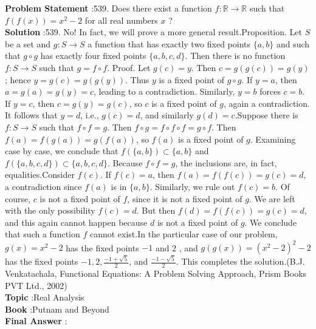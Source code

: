 \documentclass[10pt]{article}
\begin{document}
\textbf{Problem Statement} :539. Does there exist a function $f: \mathbb{R} \rightarrow \mathbb{R}$ such that $f(f(x))=x^{2}-2$ for all real numbers $x$ ?\\
\textbf{Solution} :539. No! In fact, we will prove a more general result.Proposition. Let $S$ be a set and $g: S \rightarrow S$ a function that has exactly two fixed points $\{a, b\}$ and such that $g \circ g$ has exactly four fixed points $\{a, b, c, d\}$. Then there is no function $f: S \rightarrow S$ such that $g=f \circ f$. Proof. Let $g(c)=y$. Then $c=g(g(c))=g(y)$; hence $y=g(c)=g(g(y))$. Thus $y$ is a fixed point of $g \circ g$. If $y=a$, then $a=g(a)=g(y)=c$, leading to a contradiction. Similarly, $y=b$ forces $c=b$. If $y=c$, then $c=g(y)=g(c)$, so $c$ is a fixed point of $g$, again a contradiction. It follows that $y=d$, i.e., $g(c)=d$, and similarly $g(d)=c$.Suppose there is $f: S \rightarrow S$ such that $f \circ f=g$. Then $f \circ g=f \circ f \circ f=g \circ f$. Then $f(a)=f(g(a))=g(f(a))$, so $f(a)$ is a fixed point of $g$. Examining case by case, we conclude that $f(\{a, b\}) \subset\{a, b\}$ and $f(\{a, b, c, d\}) \subset\{a, b, c, d\}$. Because $f \circ f=g$, the inclusions are, in fact, equalities.Consider $f(c)$. If $f(c)=a$, then $f(a)=f(f(c))=g(c)=d$, a contradiction since $f(a)$ is in $\{a, b\}$. Similarly, we rule out $f(c)=b$. Of course, $c$ is not a fixed point of $f$, since it is not a fixed point of $g$. We are left with the only possibility $f(c)=d$. But then $f(d)=f(f(c))=g(c)=d$, and this again cannot happen because $d$ is not a fixed point of $g$. We conclude that such a function $f$ cannot exist.In the particular case of our problem, $g(x)=x^{2}-2$ has the fixed points $-1$ and 2 , and $g(g(x))=\left(x^{2}-2\right)^{2}-2$ has the fixed points $-1,2, \frac{-1+\sqrt{5}}{2}$, and $\frac{-1-\sqrt{5}}{2}$. This completes the solution.(B.J. Venkatachala, Functional Equations: A Problem Solving Approach, Prism Books PVT Ltd., 2002)\\
\textbf{Topic} :Real Analysis\\
\textbf{Book} :Putnam and Beyond\\
\textbf{Final Answer} :\\
\end{document}
